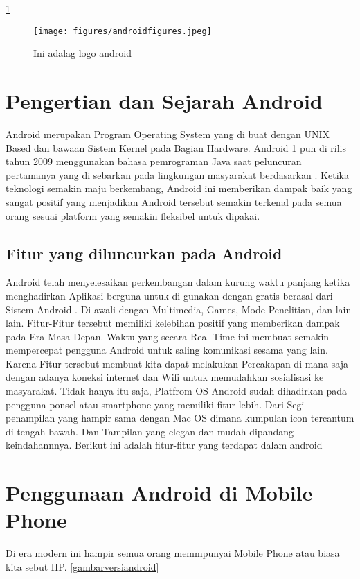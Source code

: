 
\ref{androidfigures}
\begin{figure}[ht]
\centerline{\texttt{[image: figures/androidfigures.jpeg]}}
\caption{Ini adalag logo android}
\label{androidfigures}
\end{figure}
\section{Pengertian dan Sejarah Android}
	Android merupakan Program Operating System yang di buat dengan UNIX Based dan bawaan Sistem Kernel
	pada Bagian Hardware. Android \ref{androidfigures} pun di rilis tahun 2009 menggunakan bahasa pemrograman Java saat peluncuran pertamanya yang
	di sebarkan pada lingkungan masyarakat berdasarkan \cite{rasjid2015android}. Ketika teknologi semakin maju berkembang, Android ini memberikan dampak baik yang sangat positif
	yang menjadikan Android tersebut semakin terkenal pada semua orang sesuai platform yang semakin fleksibel untuk dipakai.
	
	\subsection{Fitur yang diluncurkan pada Android}
	Android telah menyelesaikan perkembangan dalam kurung waktu panjang ketika menghadirkan Aplikasi berguna untuk di gunakan dengan gratis berasal dari Sistem Android . Di awali
	dengan Multimedia, Games, Mode Penelitian, dan lain-lain. Fitur-Fitur tersebut memiliki kelebihan positif yang memberikan dampak pada Era Masa Depan.
	Waktu yang secara Real-Time ini membuat semakin mempercepat pengguna Android untuk saling komunikasi sesama yang lain. Karena Fitur tersebut
	membuat kita dapat melakukan Percakapan di mana saja dengan adanya koneksi internet dan Wifi untuk memudahkan sosialisasi ke masyarakat.
	Tidak hanya itu saja, Platfrom OS Android sudah dihadirkan pada pengguna ponsel atau smartphone yang memiliki fitur lebih.
	Dari Segi penampilan yang hampir sama dengan Mac OS dimana kumpulan icon tercantum di tengah bawah. Dan Tampilan yang elegan dan mudah
	dipandang keindahannnya. Berikut ini adalah fitur-fitur yang terdapat dalam android \cite{triadi2013bedah}


\section{Penggunaan Android di Mobile Phone}
Di era modern ini hampir semua orang memmpunyai Mobile Phone atau biasa kita sebut HP. \cite{triadi2013bedah}
	\ref{gambarversiandroid}
